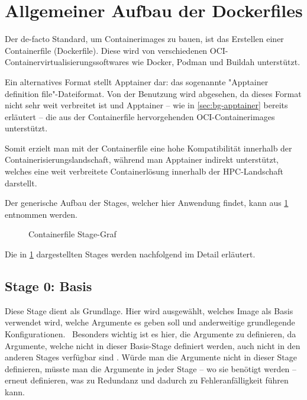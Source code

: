 \section{Allgemeiner Aufbau der Dockerfiles} \label{sec:allgemeiner-aufbau-der-dockerfiles}

Der de-facto Standard, um Containerimages zu bauen, ist das Erstellen einer Containerfile (Dockerfile). Diese wird von verschiedenen OCI-Containervirtualisierungssoftwares wie Docker, Podman und Buildah unterstützt. 

Ein alternatives Format stellt Apptainer dar: das sogenannte "Apptainer definition file"-Dateiformat. Von der Benutzung wird abgesehen, da dieses Format nicht sehr weit verbreitet ist und Apptainer – wie in \cref{sec:bg-apptainer} bereits erläutert – die aus der Containerfile hervorgehenden OCI-Containerimages unterstützt. 

Somit erzielt man mit der Containerfile eine hohe Kompatibilität innerhalb der Containerisierungslandschaft, während man Apptainer indirekt unterstützt, welches eine weit verbreitete Containerlösung innerhalb der HPC-Landschaft darstellt.

Der generische Aufbau der Stages, welcher hier Anwendung findet, kann aus \cref{fig:containerfile-stage-graph} entnommen werden.

\begin{figure}[!htbp]
    \centering
    
    \caption{Containerfile Stage-Graf}
    \label{fig:containerfile-stage-graph}
\end{figure}

\FloatBarrier

Die in \cref{fig:containerfile-stage-graph} dargestellten Stages werden nachfolgend im Detail erläutert.

\subsection{Stage 0: Basis} \label{sec:generic-stage-0}

Diese Stage dient als Grundlage. Hier wird ausgewählt, welches Image als Basis verwendet wird, welche Argumente es geben soll und anderweitige grundlegende Konfigurationen. \
Besonders wichtig ist es hier, die Argumente zu definieren, da Argumente, welche nicht in dieser Basis-Stage definiert werden, auch nicht in den anderen Stages verfügbar sind \cite[Vgl. "Understand how ARG and FROM interact"]{dockerDockerfileReference0100}. Würde man die Argumente nicht in dieser Stage definieren, müsste man die Argumente in jeder Stage – wo sie benötigt werden – erneut definieren, was zu Redundanz und dadurch zu Fehleranfälligkeit führen kann.

